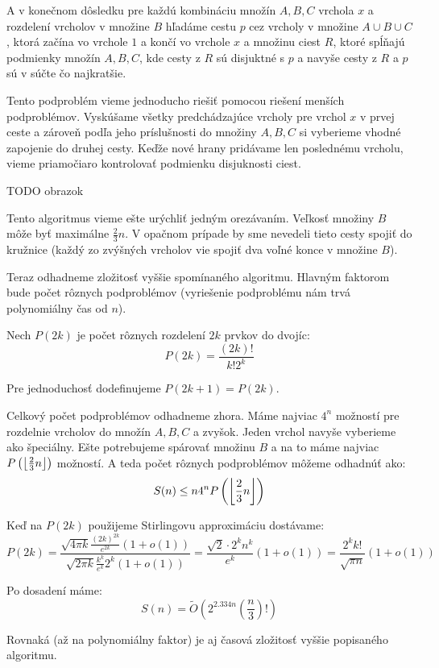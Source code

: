 A v konečnom dôsledku pre každú kombináciu množín $A, B, C$ vrchola $x$ a rozdelení
vrcholov v množine $B$ hľadáme cestu $p$ cez vrcholy v množine $A \cup B \cup C$, ktorá
začína vo vrchole $1$ a končí vo vrchole $x$ a množinu ciest $R$, ktoré
spĺňajú podmienky množín $A, B, C$, kde cesty z $R$ sú disjuktné s $p$ a navyše cesty
z $R$ a $p$ sú v súčte čo najkratšie.

Tento podproblém vieme jednoducho riešiť pomocou riešení menších podproblémov.
Vyskúšame všetky predchádzajúce vrcholy pre vrchol $x$ v prvej ceste a zároveň podľa jeho
príslušnosti do množiny $A, B, C$ si vyberieme vhodné zapojenie do druhej cesty.
Keďže nové hrany pridávame len poslednému vrcholu, vieme priamočiaro kontrolovať podmienku
disjuknosti ciest.

TODO obrazok


Tento algoritmus vieme ešte urýchliť jedným orezávaním. Veľkosť množiny
$B$ môže byť maximálne $\frac{2}{3}n$. V opačnom prípade by sme nevedeli tieto
cesty spojiť do kružnice (každý zo zvýšných vrcholov vie spojiť dva voľné konce
v množine $B$).

Teraz odhadneme zložitosť vyššie spomínaného algoritmu. Hlavným faktorom bude počet rôznych
podproblémov (vyriešenie podproblému nám trvá polynomiálny čas od $n$).

Nech $P(2k)$ je počet rôznych rozdelení $2k$ prvkov do dvojíc:
$$P(2k) = \frac{(2k)!}{k! 2^k}$$

Pre jednoduchosť dodefinujeme $P(2k+1) = P(2k)$.

%
%

Celkový počet podproblémov odhadneme zhora. Máme najviac $4^n$ možností pre rozdelnie
vrcholov do množín $A, B, C$ a zvyšok. Jeden vrchol navyše vyberieme ako špeciálny.
Ešte potrebujeme spárovať množinu $B$ a na to máme najviac $P\left(\floor*{\frac{2}{3}n}\right)$
možností. A teda počet rôznych podproblémov môžeme odhadnúť ako:
$$S(n) \leq n 4^n P\left(\floor*{\frac{2}{3}n}\right)$$

Keď na $P(2k)$ použijeme Stirlingovu approximáciu dostávame:
$$P(2k) = \frac{\sqrt{4\pi k}\frac{(2k)^{2k}}{e^{2k}} (1 + o(1))}
{\sqrt{2\pi k}\frac{k^{k}}{e^{k}} 2^k (1 + o(1))} =
\frac{\sqrt{2} \cdot{}2^k n^k}{e^k} (1 + o(1)) =
\frac{2^k k!}{\sqrt{\pi n}} (1 + o(1)) $$

Po dosadení máme:
$$S(n) = \tilde{O}\left(2^{2.334n} \left(\frac{n}{3}\right)!\right)$$

Rovnaká (až na polynomiálny faktor) je aj časová zložitosť vyššie popisaného algoritmu.
